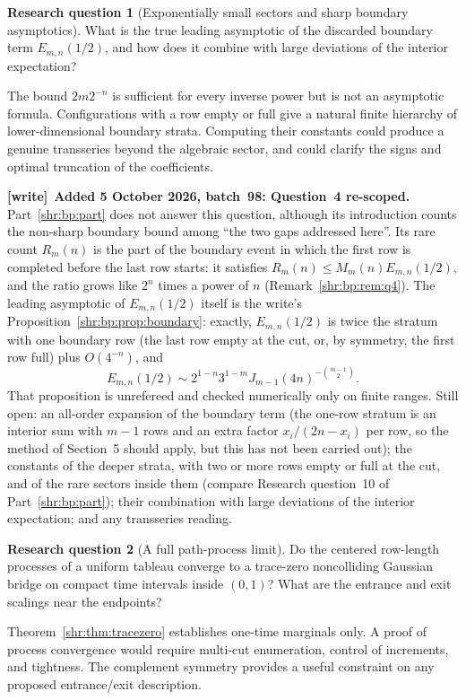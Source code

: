 \documentclass[11pt,letterpaper]{article}
\numberwithin{equation}{section}
\theoremstyle{definition}
\newtheorem{question}{Research question}
\newcommand{\1}{\mathbf 1}
\newenvironment{writenote}[1][]{\par\smallskip\begingroup\small
 \noindent\textbf{[write]}\if\relax\detokenize{#1}\relax\else~\textbf{#1.}\fi\ }%
 {\par\endgroup\smallskip}
\begin{document}
\begin{question}[Exponentially small sectors and sharp boundary asymptotics]
What is the true leading asymptotic of the discarded boundary term
$E_{m,n}(1/2)$, and how does it combine with large deviations of the
interior expectation?
\end{question}
The bound $2m2^{-n}$ is sufficient for every inverse power but is not an
asymptotic formula. Configurations with a row empty or full give a natural
finite hierarchy of lower-dimensional boundary strata. Computing their
constants could produce a genuine transseries beyond the algebraic sector,
and could clarify the signs and optimal truncation of the coefficients.

\begin{writenote}[Added 5 October 2026, batch~98: Question~4 re-scoped]
Part~\ref{shr:bp:part} does not answer this question, although its
introduction counts the non-sharp boundary bound among ``the two gaps
addressed here''. Its rare count $R_m(n)$ is the part of the boundary event
in which the first row is completed before the last row starts: it
satisfies $R_m(n)\le M_m(n)E_{m,n}(1/2)$, and the ratio grows like $2^n$
times a power of $n$ (Remark~\ref{shr:bp:rem:q4}). The leading asymptotic
of $E_{m,n}(1/2)$ itself is the write's
Proposition~\ref{shr:bp:prop:boundary}: exactly, $E_{m,n}(1/2)$ is twice
the stratum with one boundary row (the last row empty at the cut, or, by
symmetry, the first row full) plus $O(4^{-n})$, and
\[
 E_{m,n}(1/2)\sim2^{1-n}3^{1-m}J_{m-1}(4n)^{-\binom{m-1}2}.
\]
That proposition is unrefereed and checked numerically only on finite
ranges. Still open: an all-order expansion of the boundary term (the
one-row stratum is an interior sum with $m-1$ rows and an extra factor
$x_i/(2n-x_i)$ per row, so the method of Section~5 should apply, but this
has not been carried out); the constants of the deeper strata, with two or
more rows empty or full at the cut, and of the rare sectors inside them
(compare Research question~10 of Part~\ref{shr:bp:part}); their
combination with large deviations of the interior expectation; and any
transseries reading.
\end{writenote}

\begin{question}[A full path-process limit]
Do the centered row-length processes of a uniform tableau converge to a
trace-zero noncolliding Gaussian bridge on compact time intervals inside
$(0,1)$? What are the entrance and exit scalings near the endpoints?
\end{question}
Theorem~\ref{shr:thm:tracezero} establishes one-time marginals only. A proof of
process convergence would require multi-cut enumeration, control of
increments, and tightness. The complement symmetry provides a useful
constraint on any proposed entrance/exit description.
\end{document}
